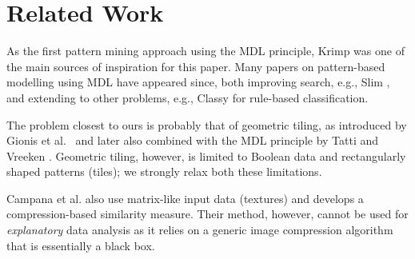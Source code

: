 \documentclass{llncs}
\begin{document}
\section{Related Work}

As the first pattern mining approach using the MDL principle, Krimp \cite{krimp} was one of the main sources of inspiration for this paper. Many papers on pattern-based modelling using MDL have appeared since, both improving search, e.g., Slim \cite{slim}, and extending to other problems, e.g., Classy \cite{classy} for rule-based classification.

The problem closest to ours is probably that of geometric tiling, as introduced by Gionis et al.\ \cite{gionis2004tiles} and later also combined with the MDL principle by Tatti and Vreeken \cite{tatti2012stijl}. Geometric tiling, however, is limited to Boolean data and rectangularly shaped patterns (tiles); we strongly relax both these limitations.

Campana et al. \cite{campana2010compression} also use matrix-like input data (textures) and develops a compression-based similarity measure. Their method, however, cannot be used for \emph{explanatory} data analysis as it relies on a generic image compression algorithm that is essentially a black box.

\end{document}

